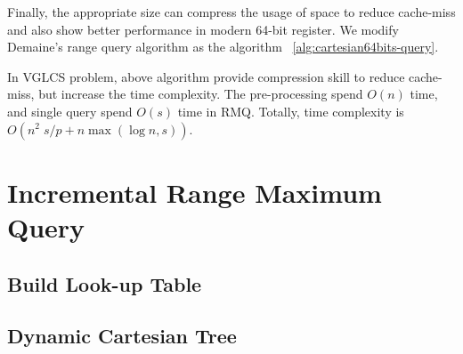 Finally, the appropriate size can compress the usage of space to reduce cache-miss and also show better performance in modern 64-bit register.  We modify Demaine's range query algorithm as the algorithm ~\ref{alg:cartesian64bits-query}.





In VGLCS problem, above algorithm provide compression skill to reduce cache-miss, but increase the time complexity. The pre-processing spend $O(n)$ time, and single query spend $O(s)$ time in RMQ. Totally, time complexity is $O(n^2 \; s / p + n \max(\log n, s))$.

\section{Incremental Range Maximum Query}

\subsection{Build Look-up Table}

\subsection{Dynamic Cartesian Tree}
